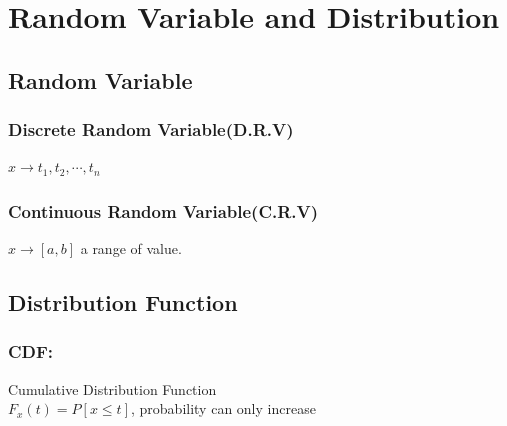 \documentclass{article}
\begin{document}
\section{Random Variable and Distribution}{
    \subsection{Random Variable}{
        \subsubsection{Discrete Random Variable(D.R.V)}{
            $ x\rightarrow t_1, t_2, \cdots, t_n$
        }
        \subsubsection{Continuous Random Variable(C.R.V)}{
            $ x\rightarrow [a, b]$ a range of value.
        }
    }
    \subsection{Distribution Function}{
        \subsubsection{CDF: }{
            Cumulative Distribution Function\\
            $ F_x(t)= P[x\le t]$, probability can only increase\\

}}}
\end{document}
